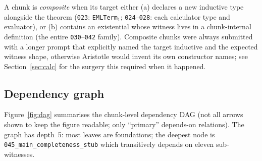 \documentclass[11pt,a4paper]{article}
\theoremstyle{plain}
\theoremstyle{definition}
\begin{document}
A chunk is \emph{composite} when its target either (a) declares a new
inductive type alongside the theorem (\texttt{023}: \texttt{EMLTerm}$_1$;
\texttt{024}--\texttt{028}: each calculator type and evaluator), or (b)
contains an existential whose witness lives in a chunk-internal
definition (the entire \texttt{030}--\texttt{042} family).  Composite
chunks were always submitted with a longer prompt that explicitly named
the target inductive and the expected witness shape, otherwise
Aristotle would invent its own constructor names; see
Section~\ref{sec:calc} for the surgery this required when it happened.

\subsection{Dependency graph}

Figure~\ref{fig:dag} summarises the chunk-level dependency DAG (not all
arrows shown to keep the figure readable; only ``primary'' depends-on
relations).  The graph has depth~5: most leaves are foundations; the
deepest node is \texttt{045\_main\_completeness\_stub} which transitively
depends on eleven sub-witnesses.
\end{document}
